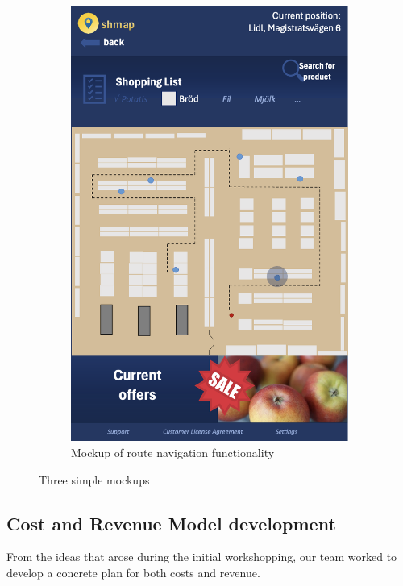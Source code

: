 \documentclass[titlepage]{article}
\begin{document}
\begin{figure}[h!]
\begin{subfigure}[b]{0.3\linewidth}
      \includegraphics[width=\textwidth]{ShopRoute.png}
    \caption{Mockup of route navigation functionality}
      \end{subfigure}
    \caption{Three simple mockups}
    \label{fig:mockups}
\end{figure}

\subsection{Cost and Revenue Model development}

From the ideas that arose during the initial workshopping, our team worked to develop a concrete plan for both costs and revenue.
\end{document}
